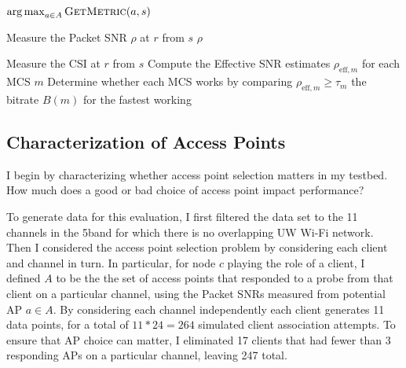 \begin{algorithm}[tp]
\caption{\label{alg:ap_sel_basic}}
\begin{algorithmic}[1]
\RETURN $\operatorname*{arg\,max}_{a\in A} \textsc{GetMetric}(a, s)$ \hfill {}
\end{algorithmic}
\end{algorithm}
\begin{algorithm}[tp]
\caption{\label{alg:snr_link_metric}}
\begin{algorithmic}[1]
\STATE Measure the Packet SNR $\rho$ at $r$ from $s$
\RETURN $\rho$
\end{algorithmic}
\end{algorithm}
\begin{algorithm}[tp]
\caption{\label{alg:eff_snr_link_metric}}
\begin{algorithmic}[1]
\STATE Measure the CSI at $r$ from $s$ \hfill {}
\STATE Compute the Effective SNR estimates $\rho_{\text{eff},m}$ for each MCS $m$
\STATE Determine whether each MCS works by comparing $\rho_{\text{eff},m} \geq \tau_m$
\RETURN the bitrate $B(m)$ for the fastest working 
\end{algorithmic}
\end{algorithm}

\subsection{Characterization of Access Points}
I begin by characterizing whether access point selection matters in my testbed. How much does a good or bad choice of access point impact performance?

To generate data for this evaluation, I first filtered the data set to the 11 channels in the 5\GHz band for which there is no overlapping UW Wi-Fi network. Then I considered the access point selection problem by considering each client and channel in turn. In particular, for node $c$ playing the role of a client, I defined $A$ to be the the set of access points that responded to a probe from that client on a particular channel, using the Packet SNRs measured from potential AP $a \in A$. By considering each channel independently each client generates 11 data points, for a total of $11*24=264$ simulated client association attempts. To ensure that AP choice can matter, I eliminated 17 clients that had fewer than 3 responding APs on a particular channel, leaving 247 total.

